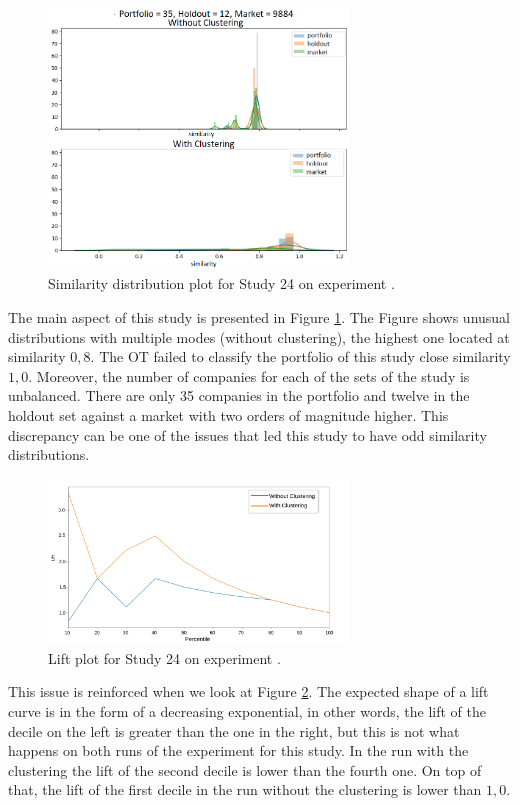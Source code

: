 \begin{figure}[!ht]
   \centering
   \includegraphics[width=8cm]{fig/ch4-outlier-study-24-exp-2.png}
   \caption{Similarity distribution plot for Study 24 on experiment \nameExperimentII{}.}
   \label{fig:outlier-study-24-exp-2}
\end{figure}

The main aspect of this study is presented in Figure \ref{fig:outlier-study-24-exp-2}. The Figure shows unusual distributions with multiple modes (without clustering), the highest one located at similarity $0,8$. The OT failed to classify the portfolio of this study close similarity $1,0$. Moreover, the number of companies for each of the sets of the study is unbalanced. There are only 35 companies in the portfolio and twelve in the holdout set against a market with two orders of magnitude higher. This discrepancy can be one of the issues that led this study to have odd similarity distributions.

\begin{figure}[!ht]
   \centering
   \includegraphics[width=8cm]{fig/ch4-outlier-study-24-lift-exp-2.png}
   \caption{Lift plot for Study 24 on experiment \nameExperimentII{}.}
   \label{fig:outlier-study-24-lift-exp-2}
\end{figure}

This issue is reinforced when we look at Figure \ref{fig:outlier-study-24-lift-exp-2}. The expected shape of a lift curve is in the form of a decreasing exponential, in other words, the lift of the decile on the left is greater than the one in the right, but this is not what happens on both runs of the experiment for this study. In the run with the clustering the lift of the second decile is lower than the fourth one. On top of that, the lift of the first decile in the run without the clustering is lower than $1,0$. 

